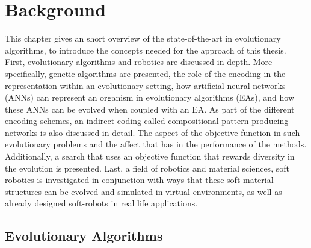 
\chapter{Background} %

\label{Background} %


This chapter gives an short overview of the state-of-the-art in evolutionary algorithms, to introduce the concepts needed for the approach of this thesis. First, evolutionary algorithms and robotics are discussed in depth. More specifically, genetic algorithms are presented, the role of the encoding in the representation within an evolutionary setting,  how artificial neural networks (ANNs) can represent an organism in evolutionary algorithms (EAs), and how these ANNs can be evolved when coupled with an EA. As part of the different encoding schemes, an indirect coding called compositional pattern producing networks is also discussed in detail. The aspect of the objective function in such evolutionary problems and the affect that has in the performance of the methods. Additionally, a search that uses an objective function that rewards diversity in the evolution is presented. Last, a field of robotics and material sciences, soft robotics is investigated in conjunction with ways that these soft material structures can be evolved and simulated in virtual environments, as well as already designed soft-robots in real life applications.




\section{Evolutionary Algorithms}

